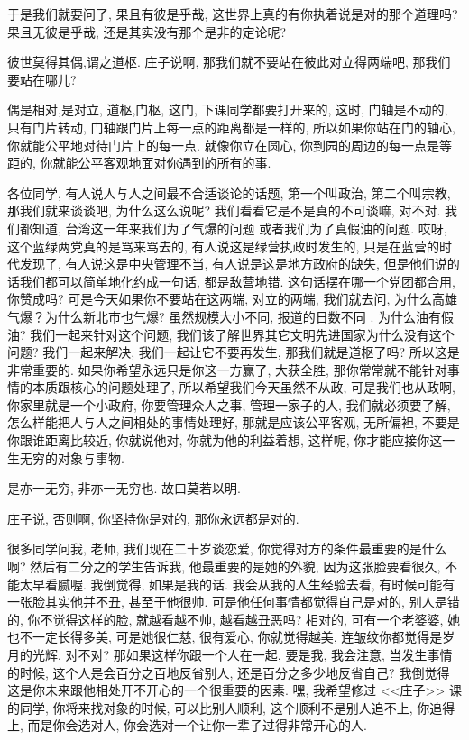 \documentclass[11pt]{article}
\begin{document}
于是我们就要问了, {\color{blue} 果且有彼是乎哉}, 这世界上真的有你执着说是对的那个道理吗? {\color{blue} 果且无彼是乎哉}, 还是其实没有那个是非的定论呢?

{\color{blue} 彼世莫得其偶,谓之道枢.} 庄子说啊, 那我们就不要站在彼此对立得两端吧, 那我们要站在哪儿? 

偶是相对,是对立, 道枢,门枢, 这门, 下课同学都要打开来的, 这时, 门轴是不动的, 只有门片转动, 门轴跟门片上每一点的距离都是一样的, 所以如果你站在门的轴心, 你就能公平地对待门片上的每一点. 就像你立在圆心, 你到园的周边的每一点是等距的, 你就能公平客观地面对你遇到的所有的事. 

各位同学, 有人说人与人之间最不合适谈论的话题, 第一个叫政治, 第二个叫宗教, 那我们就来谈谈吧, 为什么这么说呢? 我们看看它是不是真的不可谈嘛, 对不对. 我们都知道, 台湾这一年来我们为了气爆的问题
或者我们为了真假油的问题. 哎呀, 这个蓝绿两党真的是骂来骂去的, 有人说这是绿营执政时发生的, 只是在蓝营的时代发现了, 有人说这是中央管理不当, 有人说是这是地方政府的缺失, 但是他们说的话我们都可以简单地化约成一句话, 都是敌营地错. 这句话摆在哪一个党团都合用, 你赞成吗? 可是今天如果你不要站在这两端, 对立的两端, 我们就去问, 为什么高雄气爆？为什么新北市也气爆? 虽然规模大小不同, 报道的日数不同
. 为什么油有假油? 我们一起来针对这个问题, 我们该了解世界其它文明先进国家为什么没有这个问题? 我们一起来解决, 我们一起让它不要再发生, 那我们就是道枢了吗? 所以这是非常重要的. 如果你希望永远只是你这一方赢了, 大获全胜, 那你常常就不能针对事情的本质跟核心的问题处理了, 所以希望我们今天虽然不从政, 可是我们也从政啊, 你家里就是一个小政府, 你要管理众人之事, 管理一家子的人, 我们就必须要了解, 怎么样能把人与人之间相处的事情处理好, 那就是应该公平客观, 无所偏袒, 不要是你跟谁距离比较近, 你就说他对, 你就为他的利益着想, 这样呢, 你才能应接你这一生无穷的对象与事物.

\begin{center}
	{\color{green} 是亦一无穷, 非亦一无穷也. 故曰莫若以明. }
\end{center}

\vspace{-0.5cm}

庄子说, 否则啊, 你坚持你是对的, 那你永远都是对的.

很多同学问我, 老师, 我们现在二十岁谈恋爱, 你觉得对方的条件最重要的是什么啊? 然后有二分之的学生告诉我, 他最重要的是她的外貌, 因为这张脸要看很久, 不能太早看腻喔. 我倒觉得, 如果是我的话. 我会从我的人生经验去看, 有时候可能有一张脸其实他并不丑, 甚至于他很帅. 可是他任何事情都觉得自己是对的, 别人是错的, 你不觉得这样的脸, 就越看越不帅, 越看越丑恶吗? 相对的, 可有一个老婆婆, 她也不一定长得多美, 可是她很仁慈, 很有爱心, 你就觉得越美, 连皱纹你都觉得是岁月的光辉, 对不对? 那如果这样你跟一个人在一起, 要是我, 我会注意, 当发生事情的时候, 这个人是会百分之百地反省别人, 还是百分之多少地反省自己? 我倒觉得这是你未来跟他相处开不开心的一个很重要的因素. 嘿, 我希望修过 <<庄子>> 课的同学, 你将来找对象的时候, 可以比别人顺利, 这个顺利不是别人追不上, 你追得上, 而是你会选对人, 你会选对一个让你一辈子过得非常开心的人. 
\end{document}
